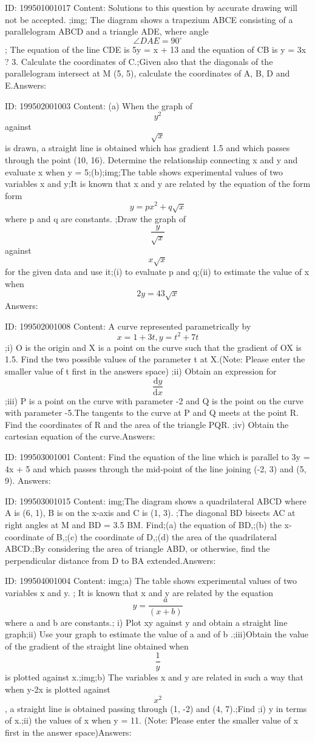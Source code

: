 \documentclass{article}
\begin{document}
ID: 199501001017
Content:
Solutions to this question by accurate drawing will not be accepted. ;img; The diagram shows a trapezium ABCE consisting of a parallelogram ABCD and a triangle ADE, where angle \[\angle DAE = 90^{\circ}\]; The equation of the line CDE is 5y = x + 13 and the equation of CB is y = 3x ? 3.  Calculate the coordinates of C.;Given also that the diagonals of the parallelogram intersect at M (5, 5), calculate the coordinates of A, B, D and E.Answers:

ID: 199502001003
Content:
(a) When the graph of \[y^{2}\]  against \[\sqrt{x}\]  is drawn, a straight line is obtained which has gradient 1.5 and which passes through the point (10, 16). Determine the relationship connecting x and y and evaluate x when y = 5;(b);img;The table shows experimental values of two variables x and y;It is known that x and y are related by the equation of the form form \[y = px^{2}+ q\sqrt{x}\] where p and q are constants. ;Draw the graph of \[\frac{y}{\sqrt{x}}\]  against \[x\sqrt{x}\]  for the given data and use it;(i) to evaluate p and q;(ii) to estimate the value of x when \[2y = 43\sqrt{x}\]Answers:

ID: 199502001008
Content:
A curve represented parametrically by  \[x = 1 + 3t, y = t^{2}+ 7t\] ;i) O is the origin and X is a point on the curve such that the gradient of OX is 1.5. Find the two possible values of the parameter t at X.(Note: Please enter the smaller value of t first in the answers space) ;ii) Obtain an expression for \[\frac{\mathrm{d}y }{\mathrm{d} x}\] ;iii) P is a point on the curve with parameter -2 and Q is the point on the curve with parameter -5.The tangents to the curve at P and Q meets at the point R. Find the coordinates of R and the area of the triangle PQR.  ;iv) Obtain the cartesian equation of the curve.Answers:

ID: 199503001001
Content:
Find the equation of the line which is parallel to 3y = 4x + 5 and which passes through the mid-point of the line joining (-2, 3) and (5, 9). Answers:

ID: 199503001015
Content:
img;The diagram shows a quadrilateral ABCD where A is (6, 1), B is on the x-axis and C is (1, 3). ;The diagonal BD bisects AC at right angles at M and BD = 3.5 BM. Find;(a)	the equation of BD,;(b)	the x-coordinate of B,;(c)	the coordinate of D,;(d)	the area of the quadrilateral ABCD.;By considering the area of triangle ABD, or otherwise, find the perpendicular distance from D to BA extended.Answers:

ID: 199504001004
Content:
img;a) The table shows experimental values of two variables x and y. ; It is known that x and y are related by the equation \[y=\frac{a}{\left ( x+b \right )}\]where a and b are constants.; i) Plot xy against y and obtain a straight line graph;ii) Use your graph to estimate the value of a and of b .;iii)Obtain the value of the gradient of the straight line obtained when \[\frac{1}{y}\]is plotted against x.;img;b) The variables x and y are related in such a way that when y-2x is plotted against \[x^{2}\], a straight line is obtained passing through (1, -2) and (4, 7).;Find ;i)	y in terms of x.;ii)	the values of x when y = 11. (Note: Please enter the smaller value of x first in the answer space)Answers:
\end{document}
